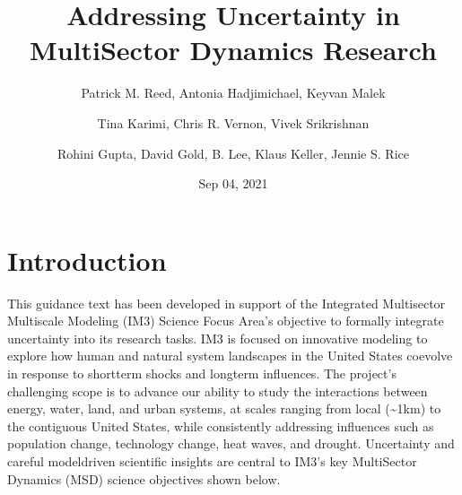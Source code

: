 \documentclass[letterpaper,10pt,english]{book}
\title{\textbf{Addressing Uncertainty in MultiSector Dynamics Research}}
\date{Sep 04, 2021}
\author{Patrick M. Reed, Antonia Hadjimichael, Keyvan Malek\and Tina Karimi, Chris R. Vernon, Vivek Srikrishnan\and Rohini Gupta, David Gold, B. Lee, Klaus Keller, Jennie S. Rice}
\begin{document}
\pagestyle{empty}
\sphinxmaketitle
\pagestyle{plain}
\sphinxtableofcontents
\pagestyle{normal}
\label{\detokenize{index::doc}}



\chapter{Introduction}
\label{\detokenize{1_introduction:introduction}}\label{\detokenize{1_introduction:id1}}\label{\detokenize{1_introduction::doc}}
\sphinxAtStartPar
This guidance text has been developed in support of the Integrated Multisector Multiscale Modeling (IM3) Science Focus Area’s objective to formally integrate uncertainty into its research tasks. IM3 is focused on innovative modeling to explore how human and natural system landscapes in the United States co\sphinxhyphen{}evolve in response to short\sphinxhyphen{}term shocks and long\sphinxhyphen{}term influences. The project’s challenging scope is to advance our ability to study the interactions between energy, water, land, and urban systems, at scales ranging from local (\textasciitilde{}1km) to the contiguous United States, while consistently addressing influences such as population change, technology change, heat waves, and drought. Uncertainty and careful model\sphinxhyphen{}driven scientific insights are central to IM3’s key MultiSector Dynamics (MSD) science objectives shown below.

\sphinxAtStartPar
{}

\sphinxAtStartPar
{}

\sphinxAtStartPar
{}

\sphinxAtStartPar
{}
\end{document}
